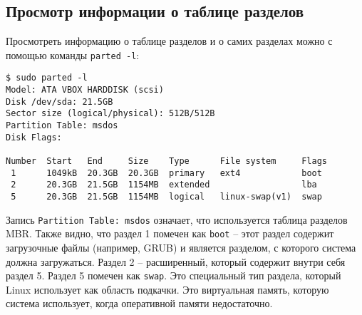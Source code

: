 \documentclass[10pt]{article}
\begin{document}
\subsection*{Просмотр информации о таблице разделов}
Просмотреть информацию о таблице разделов и о самих разделах можно с помощью команды \texttt{parted -l}:
\begin{lstlisting}
$ sudo parted -l
Model: ATA VBOX HARDDISK (scsi)
Disk /dev/sda: 21.5GB
Sector size (logical/physical): 512B/512B
Partition Table: msdos
Disk Flags: 

Number  Start   End     Size    Type      File system     Flags
 1      1049kB  20.3GB  20.3GB  primary   ext4            boot
 2      20.3GB  21.5GB  1154MB  extended                  lba
 5      20.3GB  21.5GB  1154MB  logical   linux-swap(v1)  swap
\end{lstlisting}
Запись \texttt{Partition Table: msdos} означает, что используется таблица разделов MBR. Также видно, что раздел 1 помечен как \texttt{boot} -- этот раздел содержит загрузочные файлы (например, GRUB) и является разделом, с которого система должна загружаться. Раздел 2 -- расширенный, который содержит внутри себя раздел 5. Раздел 5 помечен как \texttt{swap}. Это специальный тип раздела, который Linux использует как область подкачки. Это виртуальная память, которую система использует, когда оперативной памяти недостаточно.
\end{document}
